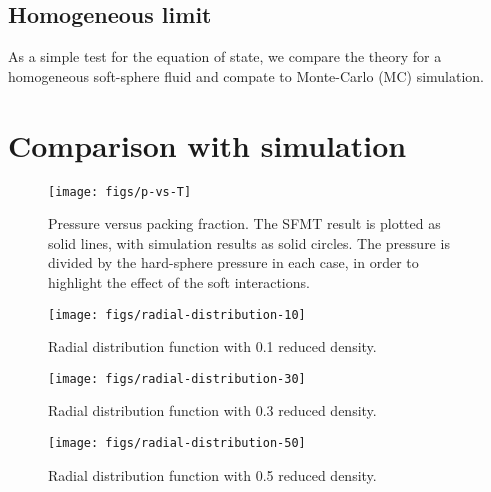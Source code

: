 \documentclass[letterpaper,twocolumn,amsmath,amssymb,prb]{revtex4-1}
\begin{document}
\subsection{Homogeneous limit}

As a simple test for the equation of state, we compare the theory for
a homogeneous soft-sphere fluid and compate to Monte-Carlo (MC) simulation.
 
\section{Comparison with simulation}

\begin{figure}
\begin{center}
\texttt{[image: figs/p-vs-T]}
\end{center}
\caption{Pressure versus packing fraction.  The SFMT result is plotted
  as solid lines, with simulation results as solid circles.  The
  pressure is divided by the hard-sphere pressure in each case, in
  order to highlight the effect of the soft interactions.}
\label{fig:p-vs-packing}
\end{figure}

\begin{figure}
\begin{center}
\texttt{[image: figs/radial-distribution-10]}
\end{center}
\caption{Radial distribution function with 0.1 reduced density.}
\label{fig:radial-distribution-10}
\end{figure}

\begin{figure}
\begin{center}
\texttt{[image: figs/radial-distribution-30]}
\end{center}
\caption{Radial distribution function with 0.3 reduced density.}
\label{fig:radial-distribution-30}
\end{figure}


\begin{figure}
\begin{center}
\texttt{[image: figs/radial-distribution-50]}
\end{center}
\caption{Radial distribution function with 0.5 reduced density.}
\label{fig:radial-distribution-50}
\end{figure}
\end{document}
